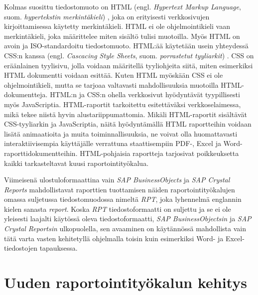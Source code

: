 Kolmas suosittu tiedostomuoto on HTML (engl. \textit{Hypertext Markup Language}, suom. \textit{hypertekstin merkintäkieli}) , joka on erityisesti verkkosivujen kirjoittamisessa käytetty merkintäkieli. HTML ei ole ohjelmointikieli vaan merkintäkieli, joka määrittelee miten sisältö tulisi muotoilla. Myös HTML on avoin ja ISO-standardoitu tiedostomuoto.\cite{iso_html} HTML:ää käytetään usein yhteydessä CSS:n kanssa (engl. \textit{Cascacing Style Sheets}, suom. \textit{porrastetut tyyliarkit}) . CSS on eräänlainen tyylisivu, jolla voidaan määritellä tyyliohjeita siitä, miten esimerkiksi HTML dokumentti voidaan esittää. Kuten HTML myöskään CSS ei ole ohjelmointikieli, mutta se tarjoaa valtavasti mahdollisuuksia muotoilla HTML-dokumentteja. HTML:n ja CSS:n ohella verkkosivut hyödyntävät tyypillisesti myös JavaScriptia. HTML-raportit tarkoitettu esitettäväksi verkkoselaimessa, mikä tekee niistä hyvin alustariippumattomia. Mikäli HTML-raportit sisältävät CSS-tyyliarkin ja JavaScriptia, näitä hyödyntämällä HTML raportteihin voidaan lisätä animaatioita ja muita toiminnallisuuksia, ne voivat olla huomattavasti interaktiivisempia käyttäjälle verrattuna staattisempiin PDF-, Excel ja Word-raporttidokumentteihin. HTML-pohjaisia raportteja tarjosivat poikkeuksetta kaikki tarkasteltavat kuusi raportointityökalua.

Viimeisenä ulostuloformaattina vain \textit{SAP BusinessObjects} ja \textit{SAP Crystal Reports} mahdollistavat raporttien tuottamisen näiden raportointityökalujen omassa suljetussa tiedostomuodossa nimeltä \textit{RPT}, joka lyhennelmä englannin kielen sanasta \textit{report}. Koska \textit{RPT} tiedostoformaatti on suljettu ja se ei ole yleisesti laajalti käytössä oleva tiedostoformaatti, \textit{SAP BusinessObjectsin} ja \textit{SAP Crystal Reportsin} ulkopuolella, sen avaaminen on käytännössä mahdollista vain tätä varta vasten kehitetyllä ohjelmalla toisin kuin esimerkiksi Word- ja Excel-tiedostojen tapauksessa.

\section{Uuden raportointityökalun kehitys} \label{Uuden kehitys}

